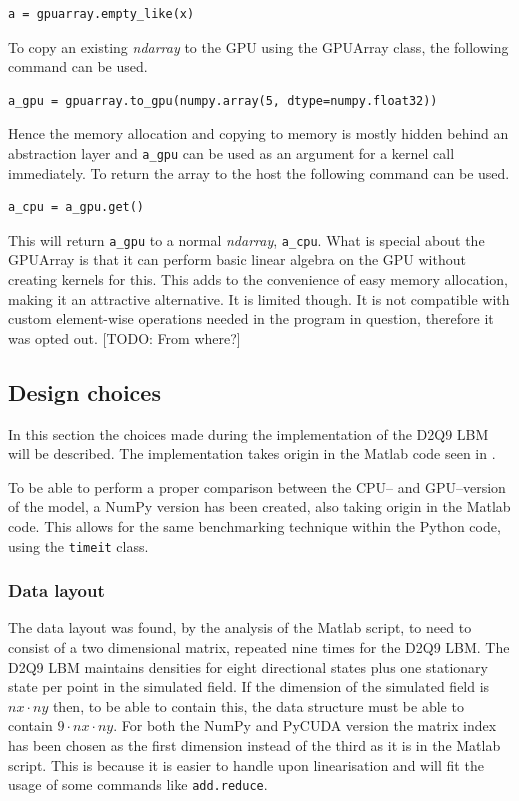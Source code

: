 \begin{verbatim}
a = gpuarray.empty_like(x)
\end{verbatim}

To copy an existing \textit{ndarray} to the GPU using the GPUArray class, the following command can be used.

\begin{verbatim}
a_gpu = gpuarray.to_gpu(numpy.array(5, dtype=numpy.float32))
\end{verbatim}

Hence the memory allocation and copying to memory is mostly hidden behind an abstraction layer and \texttt{a\_gpu} can be used as an argument for a kernel call immediately. To return the array to the host the following command can be used.

\begin{verbatim}
a_cpu = a_gpu.get()
\end{verbatim}

This will return \texttt{a\_gpu} to a normal \textit{ndarray}, \texttt{a\_cpu}. What is special about the GPUArray is that it can perform basic linear algebra on the GPU without creating kernels for this. This adds to the convenience of easy memory allocation, making it an attractive alternative. It is limited though. It is not compatible with custom element-wise operations needed in the program in question, therefore it was opted out. [TODO: From where?]



\subsection{Design choices}
In this section the choices made during the implementation of the D2Q9 LBM will be described. The implementation takes origin in the Matlab code seen in .

To be able to perform a proper comparison between the CPU-- and GPU--version of the model, a NumPy version has been created, also taking origin in the Matlab code. This allows for the same benchmarking technique within the Python code, using the \texttt{timeit} class.



\subsubsection{Data layout}
The data layout was found, by the analysis of the Matlab script, to need to consist of a two dimensional matrix, repeated nine times for the D2Q9 LBM. The D2Q9 LBM maintains densities for eight directional states plus one stationary state per point in the simulated field. If the dimension of the simulated field is $nx \cdot ny$ then, to be able to contain this, the data structure must be able to contain $9 \cdot nx \cdot ny$. For both the NumPy and PyCUDA version the matrix index has been chosen as the first dimension instead of the third as it is in the Matlab script. This is because it is easier to handle upon linearisation and will fit the usage of some commands like \texttt{add.reduce}.



